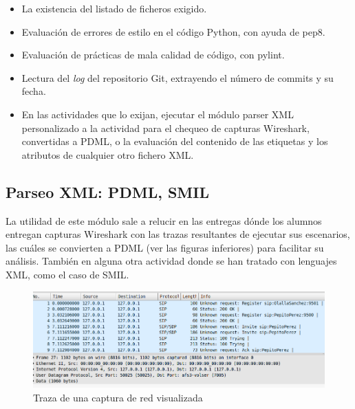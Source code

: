 \begin{itemize}
\item La existencia del listado de ficheros exigido.\\

\item Evaluación de errores de estilo en el código Python, con ayuda de pep8.\\

\item Evaluación de prácticas de mala calidad de código, con pylint.\\

\item Lectura del \textit{log} del repositorio Git, extrayendo el número de commits y su fecha.\\

\item En las actividades que lo exijan, ejecutar el módulo parser XML personalizado a la actividad para el chequeo de capturas Wireshark, convertidas a PDML, o la evaluación del contenido de las etiquetas y los atributos de cualquier otro fichero XML.
\end{itemize}


\subsection{Parseo XML: PDML, SMIL}
\label{sec:parseo}

La utilidad de este módulo sale a relucir en las entregas dónde los alumnos entregan capturas Wireshark con las trazas resultantes de ejecutar sus escenarios, las cuáles se convierten a PDML (ver las figuras inferiores) para facilitar su análisis. También en alguna otra actividad donde se han tratado con lenguajes XML, como el caso de SMIL.\\


\begin{figure}[H]
   \centering
   \includegraphics[width=16cm]{img/Selection_014_traza_wireshark}
   \caption{Traza de una captura de red visualizada}
   \label{figura:traza_wireshark}
\end{figure}



